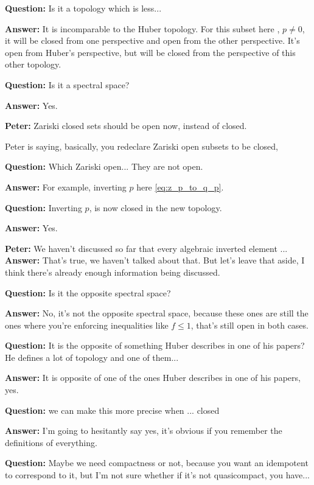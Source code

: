 \begin{example}
\textbf{Question:} Is it a topology which is less...

\textbf{Answer:} It is incomparable to the Huber topology. For this subset here , $p \neq 0$, it will be closed from one perspective and open from the other perspective. It's open from Huber's perspective, but will be closed from the perspective of this other topology.

\textbf{Question:} Is it a spectral space?

\textbf{Answer:} Yes.

\textbf{Peter:}  Zariski closed sets should be open now, instead of closed.

Peter is saying, basically, you redeclare Zariski open subsets to be closed, 

\textbf{Question:} Which  Zariski open... They are not open.


\textbf{Answer:} For example, inverting $p$ here \ref{eq:z_p_to_q_p}. 

\textbf{Question:} Inverting $p$, is now closed in the new topology. 

\textbf{Answer:} Yes.

\textbf{Peter:} We haven't discussed so far that every algebraic inverted element ...  
\textbf{Answer:} That's true, we haven't talked about that. But let's leave that aside, I think there's already enough information being discussed.

\textbf{Question:} Is it the opposite spectral space? 

\textbf{Answer:} No, it's not the opposite spectral space, because these ones are still the ones where you're enforcing inequalities like $f \leq 1$, that's still open in both cases. 

\textbf{Question:} It is the opposite of something Huber describes in one of his papers? He defines a lot of topology and one of them...

\textbf{Answer:} It is opposite of one of the ones Huber describes in one of his papers, yes. 

\textbf{Question:} we can make this more precise when ... closed 

\textbf{Answer:} I'm going to hesitantly say yes, it's obvious if you remember the definitions of everything. 

\textbf{Question:} Maybe we need  compactness or not, because you want an idempotent  to correspond to it, but I'm not sure whether if it's not quasicompact, you have...


\end{example}
